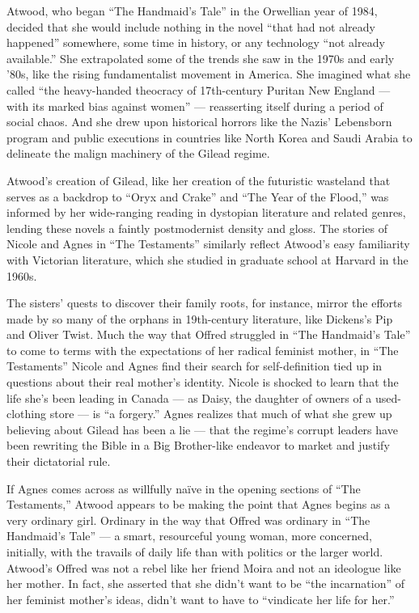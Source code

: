 Atwood, who began ``The Handmaid's Tale'' in the Orwellian year of 1984,
decided that she would include nothing in the novel ``that had not
already happened'' somewhere, some time in history, or any technology
``not already available.'' She extrapolated some of the trends she saw
in the 1970s and early '80s, like the rising fundamentalist movement in
America. She imagined what she called ``the heavy-handed theocracy of
17th-century Puritan New England --- with its marked bias against
women'' --- reasserting itself during a period of social chaos. And she
drew upon historical horrors like the Nazis' Lebensborn program and
public executions in countries like North Korea and Saudi Arabia to
delineate the malign machinery of the Gilead regime.

Atwood's creation of Gilead, like her creation of the futuristic
wasteland that serves as a backdrop to ``Oryx and Crake'' and ``The Year
of the Flood,'' was informed by her wide-ranging reading in dystopian
literature and related genres, lending these novels a faintly
postmodernist density and gloss. The stories of Nicole and Agnes in
``The Testaments'' similarly reflect Atwood's easy familiarity with
Victorian literature, which she studied in graduate school at Harvard in
the 1960s.

The sisters' quests to discover their family roots, for instance, mirror
the efforts made by so many of the orphans in 19th-century literature,
like Dickens's Pip and Oliver Twist. Much the way that Offred struggled
in ``The Handmaid's Tale'' to come to terms with the expectations of her
radical feminist mother, in ``The Testaments'' Nicole and Agnes find
their search for self-definition tied up in questions about their real
mother's identity. Nicole is shocked to learn that the life she's been
leading in Canada --- as Daisy, the daughter of owners of a
used-clothing store --- is ``a forgery.'' Agnes realizes that much of
what she grew up believing about Gilead has been a lie --- that the
regime's corrupt leaders have been rewriting the Bible in a Big
Brother-like endeavor to market and justify their dictatorial rule.

If Agnes comes across as willfully naïve in the opening sections of
``The Testaments,'' Atwood appears to be making the point that Agnes
begins as a very ordinary girl. Ordinary in the way that Offred was
ordinary in ``The Handmaid's Tale'' --- a smart, resourceful young
woman, more concerned, initially, with the travails of daily life than
with politics or the larger world. Atwood's Offred was not a rebel like
her friend Moira and not an ideologue like her mother. In fact, she
asserted that she didn't want to be ``the incarnation'' of her feminist
mother's ideas, didn't want to have to ``vindicate her life for her.''

